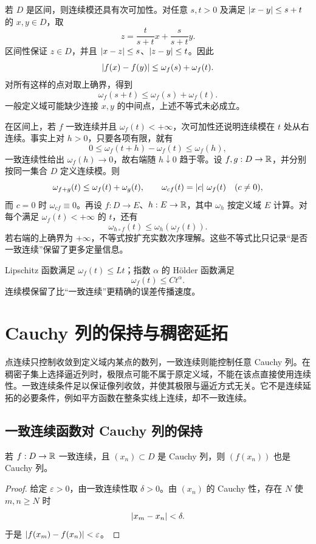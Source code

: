 若 \(D\) 是区间，则连续模还具有次可加性。对任意 \(s,t>0\) 及满足 \(\left|x-y\right|\le s+t\) 的 \(x,y\in D\)，取
\[
 z=\frac{t}{s+t}x+\frac{s}{s+t}y.
\]
区间性保证 \(z\in D\)，并且 \(\left|x-z\right|\le s\)、\(\left|z-y\right|\le t\)。因此
\[
 \left|f(x)-f(y)\right|
 \le \omega_f(s)+\omega_f(t).
\]
对所有这样的点对取上确界，得到
\[
 \omega_f(s+t)\le\omega_f(s)+\omega_f(t).
\]
一般定义域可能缺少连接 \(x,y\) 的中间点，上述不等式未必成立。

在区间上，若 \(f\) 一致连续并且 \(\omega_f(t)<+\infty\)，次可加性还说明连续模在 \(t\) 处从右连续。事实上对 \(h>0\)，只要各项有限，就有
\[
 0\le\omega_f(t+h)-\omega_f(t)\le\omega_f(h),
\]
一致连续性给出 \(\omega_f(h)\to0\)，故右端随 \(h\downarrow0\) 趋于零。设 \(f,g:D\to\mathbb{R}\)，并分别按同一集合 \(D\) 定义连续模。则
\[
 \omega_{f+g}(t)\le\omega_f(t)+\omega_g(t),
 \qquad
 \omega_{cf}(t)=\left|c\right|\,\omega_f(t)\quad(c\ne0),
\]
而 \(c=0\) 时 \(\omega_{cf}\equiv0\)。再设 \(f:D\to E\)、\(h:E\to\mathbb{R}\)，其中 \(\omega_h\) 按定义域 \(E\) 计算。对每个满足 \(\omega_f(t)<+\infty\) 的 \(t\)，还有
\[
 \omega_{h\circ f}(t)\le\omega_h(\omega_f(t)).
\]
若右端的上确界为 \(+\infty\)，不等式按扩充实数次序理解。这些不等式比只记录“是否一致连续”保留了更多定量信息。

\begin{example}
Lipschitz 函数满足 \(\omega_f(t)\le Lt\)；指数 \(\alpha\) 的 Hölder 函数满足
\[
 \omega_f(t)\le Ct^\alpha.
\]
连续模保留了比“一致连续”更精确的误差传播速度。
\end{example}

\section{Cauchy 列的保持与稠密延拓}

点连续只控制收敛到定义域内某点的数列，一致连续则能控制任意 Cauchy 列。在稠密子集上选择逼近列时，极限点可能不属于原定义域，不能在该点直接使用连续性。一致连续条件足以保证像列收敛，并使其极限与逼近方式无关。它不是连续延拓的必要条件，例如平方函数在整条实线上连续，却不一致连续。

\subsection{一致连续函数对 Cauchy 列的保持}


\begin{theorem}
若 \(f:D\to\mathbb{R}\) 一致连续，且 \((x_n)\subset D\) 是 Cauchy 列，则 \((f(x_n))\) 也是 Cauchy 列。
\end{theorem}

\begin{proof}
给定 \(\varepsilon>0\)，由一致连续性取 \(\delta>0\)。由 \((x_n)\) 的 Cauchy 性，存在 \(N\) 使 \(m,n\ge N\) 时
\[
 \left|x_m-x_n\right|<\delta.
\]
于是 \(\left|f(x_m)-f(x_n)\right|<\varepsilon\)。
\end{proof}

